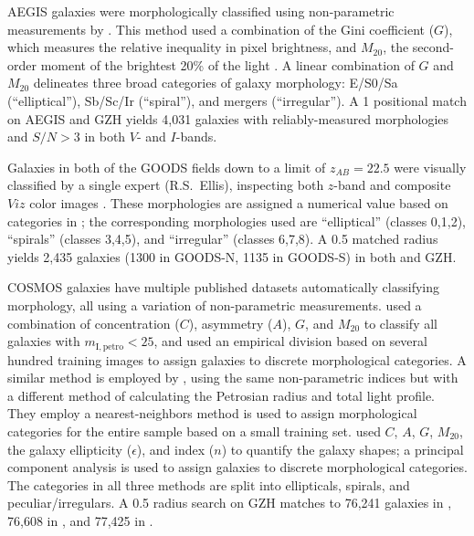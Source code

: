 \documentclass[twocolumn]{aastex6}
\begin{document}
AEGIS galaxies were morphologically classified using non-parametric measurements by \citet{lot08}. This method used a combination of the Gini coefficient ($G$), which measures the relative inequality in pixel brightness, and $M_{20}$, the second-order moment of the brightest 20\% of the light \citep{lot04}. A linear combination of $G$ and $M_{20}$ delineates three broad categories of galaxy morphology: E/S0/Sa (``elliptical''), Sb/Sc/Ir (``spiral''), and mergers (``irregular''). A 1\arcsec{} positional match on AEGIS and GZH yields 4,031 galaxies with reliably-measured morphologies and $S/N>3$ in both $V$- and $I$-bands. 

Galaxies in both of the GOODS fields down to a limit of $z_{AB}=22.5$ were visually classified by a single expert (R.S.~Ellis), inspecting both $z$-band and composite $Viz$ color images \citep{bun05}. These morphologies are assigned a numerical value based on categories in \citet{bri98a}; the corresponding morphologies used are ``elliptical'' (classes 0,1,2), ``spirals'' (classes 3,4,5), and ``irregular'' (classes 6,7,8). A 0.5\arcsec{} matched radius yields 2,435 galaxies (1300 in GOODS-N, 1135 in GOODS-S) in both \citet{bun05} and GZH.  

COSMOS galaxies have multiple published datasets automatically classifying morphology, all using a variation of non-parametric measurements. \citet{cas07} used a combination of concentration ($C$), asymmetry ($A$), $G$, and $M_{20}$ \citep{cas05} to classify all galaxies with $m_\mathrm{I,petro}<25$, and used an empirical division based on several hundred training images to assign galaxies to discrete morphological categories. A similar method is employed by \citet{tas11}, using the same non-parametric indices but with a different method of calculating the Petrosian radius and total light profile. They employ a nearest-neighbors method is used to assign morphological categories for the entire sample based on a small training set. \citet[][ZEST]{sca07} used $C$, $A$, $G$, $M_{20}$, the galaxy ellipticity ($\epsilon$), and \sersic{} index ($n$) to quantify the galaxy shapes; a principal component analysis is used to assign galaxies to discrete morphological categories. The categories in all three methods are split into ellipticals, spirals, and peculiar/irregulars. A 0.5\arcsec{} radius search on GZH matches to 76,241 galaxies in \citet{cas07}, 76,608 in \citet{tas11}, and 77,425 in \citet{sca07}.
\end{document}
